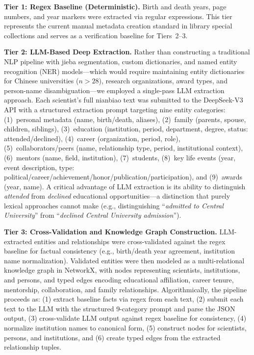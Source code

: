 \documentclass[review]{elsarticle}
\begin{document}
\textbf{Tier 1: Regex Baseline (Deterministic).} Birth and death years, page numbers, and year markers were extracted via regular expressions. This tier represents the current manual metadata creation standard in library special collections and serves as a verification baseline for Tiers~2--3.

\textbf{Tier 2: LLM-Based Deep Extraction.} Rather than constructing a traditional NLP pipeline with jieba segmentation, custom dictionaries, and named entity recognition (NER) models---which would require maintaining entity dictionaries for Chinese universities ($n>28$), research organizations, award types, and person-name disambiguation---we employed a single-pass LLM extraction approach. Each scientist's full nianbiao text was submitted to the DeepSeek-V3 API with a structured extraction prompt targeting nine entity categories: (1)~personal metadata (name, birth/death, aliases), (2)~family (parents, spouse, children, siblings), (3)~education (institution, period, department, degree, status: attended/declined), (4)~career (organization, period, role), (5)~collaborators/peers (name, relationship type, period, institutional context), (6)~mentors (name, field, institution), (7)~students, (8)~key life events (year, event description, type: political/career/achievement/honor/publication/participation), and (9)~awards (year, name). A critical advantage of LLM extraction is its ability to distinguish \textit{attended} from \textit{declined} educational opportunities---a distinction that purely lexical approaches cannot make (e.g., distinguishing ``\textit{admitted to Central University}'' from ``\textit{declined Central University admission}'').

\textbf{Tier 3: Cross-Validation and Knowledge Graph Construction.} LLM-extracted entities and relationships were cross-validated against the regex baseline for factual consistency (e.g., birth/death year agreement, institution name normalization). Validated entities were then modeled as a multi-relational knowledge graph in NetworkX, with nodes representing scientists, institutions, and persons, and typed edges encoding educational affiliation, career tenure, mentorship, collaboration, and family relationships. Algorithmically, the pipeline proceeds as: (1) extract baseline facts via regex from each text, (2) submit each text to the LLM with the structured 9-category prompt and parse the JSON output, (3) cross-validate LLM output against regex baseline for consistency, (4) normalize institution names to canonical form, (5) construct nodes for scientists, persons, and institutions, and (6) create typed edges from the extracted relationship tuples.
\end{document}
